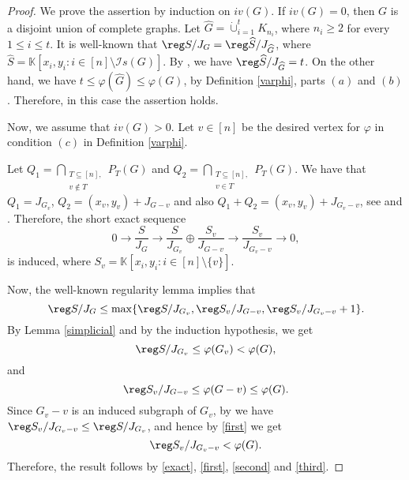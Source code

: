 \documentclass[12pt]{amsart}
\def\KK{{\mathbb K}}
\begin{document}
\begin{proof}
\par We prove the assertion by induction on $iv(G)$. If $iv(G)=0$, then $G$ is a disjoint union of complete graphs. Let $\widehat{G}=\dot{\cup}_{i=1}^{t}K_{n_i}$, where $n_i\geq 2$ for every $1\leq i \leq t$. It is well-known that $\reg S/J_G=\reg \widehat{S}/J_{\widehat{G}}$, where $\widehat{S}=\KK[x_i,y_i:i\in[n]\setminus \mathcal{I}s(G)]$. By \cite[Theorem~2.1]{SK}, we have $\reg \widehat{S}/J_{\widehat{G}}=t$. On the other hand, we have $t\leq \varphi(\widehat{G})\leq \varphi(G)$, by Definition \ref{varphi}, parts $(a)$ and $(b)$. Therefore, in this case the assertion holds. 
\par Now, we assume that $iv(G)>0$. Let $v\in [n]$ be the desired vertex for $\varphi$ in condition $(c)$ in Definition \ref{varphi}. 
\par Let $Q_1=\bigcap\limits_{\substack{T\subseteq [n],\\v\notin T}}P_T(G)$  and $Q_2=\bigcap\limits_{\substack{T\subseteq [n],\\v\in T}}P_T(G)$. We have that $Q_1=J_{G_v}$, $Q_2=(x_v,y_v)+J_{G-v}$ and also $Q_1+Q_2=(x_v,y_v)+J_{{G_v}-v}$, see \cite[Proof~of~Theorem~1.1]{EHH} and  \cite[Proof~of~Theorem~3.5]{RSK}. Therefore, the short exact sequence
\[
0\longrightarrow  \dfrac{S}{J_G}\longrightarrow \dfrac{S}{J_{G_v}}\oplus \dfrac{S_v}{J_{G-v}} \longrightarrow  \dfrac{S_v}{J_{{G_v}-v}}\longrightarrow 0,
\]
is induced, where $S_v=\KK[x_i,y_i:i\in[n]\setminus \{v\}]$. 
\par Now, the well-known regularity lemma implies that
\begin{equation}\label{exact}
\reg S/J_G\leq \max \{\reg S/J_{G_v}, \reg S_v/J_{G-v}, \reg S_v/J_{G_v-v}+1\}.
\end{equation}
By Lemma \ref{simplicial} and by the induction hypothesis, we get
\begin{equation}\label{first}
\reg S/J_{G_v}\leq \varphi(G_v)<\varphi (G),
\end{equation}
and
\begin{equation}\label{second}
\reg S_v/J_{G-v}\leq \varphi(G-v)\leq \varphi(G).
\end{equation}
Since $G_{v}-v$ is an induced subgraph of $G_v$, by \cite[Proposition~8,~part~(b)]{SK1} we have $\reg S_v/J_{G_v-v}\leq \reg S/J_{G_v}$, and hence by \eqref{first} we get 
\begin{equation}\label{third}
\reg S_v/J_{G_v-v}<\varphi(G).
\end{equation}
Therefore, the result follows by \eqref{exact}, \eqref{first}, \eqref{second} and \eqref{third}.
\end{proof}	
	
\end{document}
